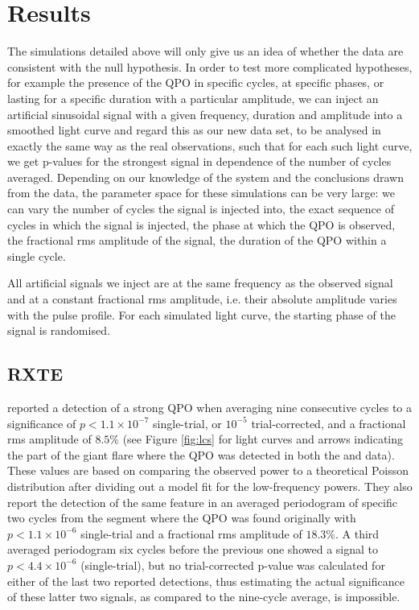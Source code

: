 \documentclass{emulateapj}
\begin{document}
\section{Results}
\label{sec:results}
The simulations detailed above will only give us an idea of whether the data are consistent with the null hypothesis. In order to test more complicated hypotheses, for example the presence of the QPO in specific cycles, at specific phases, or lasting for a specific duration with a particular amplitude, we can inject an artificial sinusoidal signal with a given frequency, duration and amplitude into a smoothed light curve and regard this as our new data set, to be analysed in exactly the same way as the real observations, such that for each such light curve, we get p-values for the strongest signal in dependence of the number of cycles averaged. Depending on our knowledge of the system and the conclusions drawn from the data, the parameter space for these simulations can be very large: we can vary the number of cycles the signal is injected into, the exact sequence of cycles in which the signal is injected, the phase at which the QPO is observed, the fractional rms amplitude of the signal, the duration of the QPO within a single cycle.

All artificial signals we inject are at the same frequency as the observed signal and at a constant fractional rms amplitude, i.e. their absolute amplitude varies with the pulse profile. For each simulated light curve, the starting phase of the signal is randomised. 




\subsection{RXTE}
\label{sec:rxte_results}


\citealt{Strohmayer06} reported a detection of a strong QPO when averaging nine consecutive cycles to a significance of $p < 1.1 \times 10^{-7}$ single-trial, or $10^{-5}$ trial-corrected, and a fractional rms amplitude of $8.5\%$ (see Figure \ref{fig:lcs} for light curves and arrows indicating the part of the giant flare where the QPO was detected in both the \rxte and \rhessi data). These values are based on comparing the observed power to a theoretical Poisson distribution after dividing out a model fit for the low-frequency powers. They also report the detection of the same feature in an averaged periodogram of specific two cycles from the segment where the QPO was found originally with $p < 1.1 \times 10^{-6}$ single-trial and a fractional rms amplitude of $18.3\%$. A third averaged periodogram six cycles before the previous one showed a signal to $p < 4.4 \times 10^{-6}$ (single-trial), but no trial-corrected p-value was calculated for either of the last two reported detections, thus estimating the actual significance of these latter two signals, as compared to the nine-cycle average, is impossible.
\end{document}
